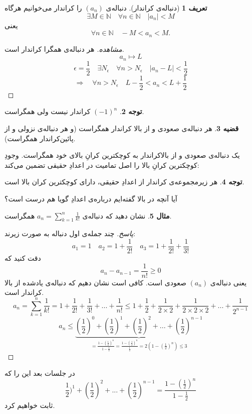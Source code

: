 \documentclass[12pt,a4paper]{article}
\theoremstyle{definition}
\newtheorem{thm}{قضیه}
\newtheorem{mesal}[thm]{مثال}
\newtheorem{tav}[thm]{توجه}
\newtheorem{defn}[thm]{تعریف}
\begin{document}
\begin{defn}[دنباله‌ی کراندار]
دنباله‌ی
$(a_n)$
را کراندار می‌خوانیم هرگاه
\[
\exists M \in \mathbb{N} \quad \forall n \in \mathbb{N} \quad |a_n|<M
\]
یعنی
\[
\forall n \in \mathbb{N}\quad 
-M<a_n<M.
\]
\end{defn}
\begin{proof}[مشاهده]
هر دنباله‌ی همگرا کراندار است.
\[
a_n \mapsto L
\]
\[
\epsilon =\frac{1}{2} \quad \exists N_\epsilon \quad \forall n>N_\epsilon \quad |a_n-L|<\frac{1}{2}
\]
\[
\Rightarrow \quad \forall n > N_\epsilon \quad L-\frac{1}{2} <a_n<L+\frac{1}{2}
\]
\end{proof}
\begin{tav}
$(-1)^n$
کراندار نیست ولی همگراست.
\end{tav}
\begin{thm}
هر دنباله‌ی صعودی و از بالا کراندار همگراست (و هر دنباله‌ی نزولی و از پائین‌کراندار همگراست).
\end{thm}
یک دنباله‌ی صعودی و از بالاکراندار به کوچکترین کرانِ بالای خود همگراست. 
وجودِ کوچکترین کرانِ بالا را اصل تمامیت در اعدادِ حقیقی تضمین می‌کند:
\begin{tav}
هر زیرمجموعه‌ی کراندار از اعدادِ حقیقی، دارای کوچکترین کران بالا است.
\end{tav}
آیا آنچه در بالا گفته‌ایم درباره‌ی اعدادِ گویا هم درست است؟
\begin{mesal}
نشان دهید که دنباله‌ی 
$a_n=\sum_{k=1}^n \frac{1}{k!}$
همگراست.
\end{mesal}
\begin{proof}[پاسخ]
چند جمله‌ی اول دنباله به صورت زیرند:
\[
a_1=1 \quad a_2=1+\frac{1}{2!} \quad a_3=1+\frac{1}{2!}+\frac{1}{3!}
\]
دقت کنید که
\[
a_n-a_{n-1}=\frac{1}{n!} \geqslant 0
\]
یعنی دنباله‌ی
$(a_n)$
صعودی است. کافی است نشان دهیم که دنباله‌ی یادشده از بالا کراندار است. 
\[
a_n=\sum_{k=1}^n\frac{1}{k!}=1+\frac{1}{2!}+\frac{1}{3!}+...+\frac{1}{n!} \leqslant 1+\frac{1}{2}+\frac{1}{2\times 2}+\frac{1}{2\times 2\times 2}+...+\frac{1}{2^{n-1}}
\]
\[
a_n \leqslant \underbrace{(\frac{1}{2})^0+(\frac{1}{2})^1+(\frac{1}{2})^2+...+(\frac{1}{2})^{n-1}}_{= \frac{1-(\frac{1}{2})^n}{1-\frac{1}{2}}=\frac{1-(\frac{1}{2})^n}{\frac{1}{2}}=2(1-(\frac{1}{2})^n) \leqslant 3}
\]
\end{proof}
در جلسات بعد این را که
\[
\frac{1}{2})^1+(\frac{1}{2})^2+...+(\frac{1}{2})^{n-1}=\frac{1-(\frac{1}{2})^n}{1-\frac{1}{2}}
\]
ثابت خواهیم کرد.
\end{document}
